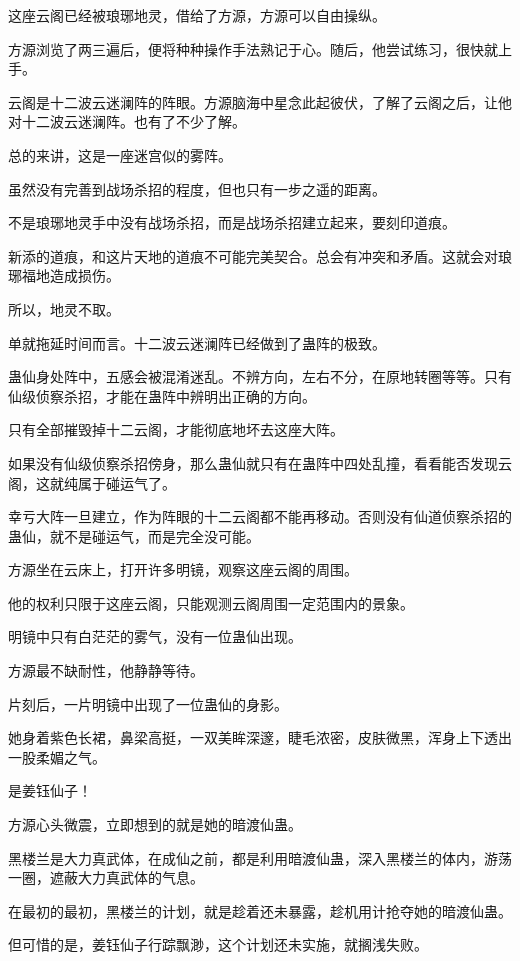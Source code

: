 \begin{this_body}
这座云阁已经被琅琊地灵，借给了方源，方源可以自由操纵。

方源浏览了两三遍后，便将种种操作手法熟记于心。随后，他尝试练习，很快就上手。

云阁是十二波云迷澜阵的阵眼。方源脑海中星念此起彼伏，了解了云阁之后，让他对十二波云迷澜阵。也有了不少了解。

总的来讲，这是一座迷宫似的雾阵。

虽然没有完善到战场杀招的程度，但也只有一步之遥的距离。

不是琅琊地灵手中没有战场杀招，而是战场杀招建立起来，要刻印道痕。

新添的道痕，和这片天地的道痕不可能完美契合。总会有冲突和矛盾。这就会对琅琊福地造成损伤。

所以，地灵不取。

单就拖延时间而言。十二波云迷澜阵已经做到了蛊阵的极致。

蛊仙身处阵中，五感会被混淆迷乱。不辨方向，左右不分，在原地转圈等等。只有仙级侦察杀招，才能在蛊阵中辨明出正确的方向。

只有全部摧毁掉十二云阁，才能彻底地坏去这座大阵。

如果没有仙级侦察杀招傍身，那么蛊仙就只有在蛊阵中四处乱撞，看看能否发现云阁，这就纯属于碰运气了。

幸亏大阵一旦建立，作为阵眼的十二云阁都不能再移动。否则没有仙道侦察杀招的蛊仙，就不是碰运气，而是完全没可能。

方源坐在云床上，打开许多明镜，观察这座云阁的周围。

他的权利只限于这座云阁，只能观测云阁周围一定范围内的景象。

明镜中只有白茫茫的雾气，没有一位蛊仙出现。

方源最不缺耐性，他静静等待。

片刻后，一片明镜中出现了一位蛊仙的身影。

她身着紫色长裙，鼻梁高挺，一双美眸深邃，睫毛浓密，皮肤微黑，浑身上下透出一股柔媚之气。

是姜钰仙子！

方源心头微震，立即想到的就是她的暗渡仙蛊。

黑楼兰是大力真武体，在成仙之前，都是利用暗渡仙蛊，深入黑楼兰的体内，游荡一圈，遮蔽大力真武体的气息。

在最初的最初，黑楼兰的计划，就是趁着还未暴露，趁机用计抢夺她的暗渡仙蛊。

但可惜的是，姜钰仙子行踪飘渺，这个计划还未实施，就搁浅失败。


\end{this_body}
